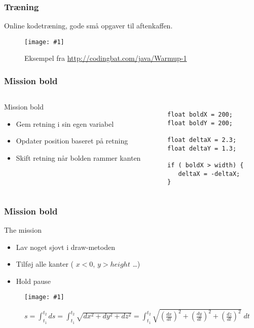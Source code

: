 \documentclass{beamer}
\newcommand{\FIG}[2]{
  \begin{figure}[]
    \centering
    \texttt{[image: \#1]}
    \caption{#2}
    \label{fig:#1}
  \end{figure}
}
\newcommand{\FIGMED}[2]{
  \begin{figure}[]
    \centering
    \texttt{[image: \#1]}
    \caption{#2}
    \label{fig:#1}
  \end{figure}
}
\begin{document}
\begin{frame}
  \frametitle{Træning}
  Online kodetræning, gode små opgaver til aftenkaffen.
  \FIG{codingbat}{Eksempel fra \url{http://codingbat.com/java/Warmup-1}}
\end{frame}


\begin{frame}[fragile]
  \frametitle{Mission bold}
  \begin{columns}
    \begin{column}{0.45\textwidth}
      \begin{block}{Mission bold}
        \begin{itemize}
        \item Gem retning i sin egen variabel
        \item Opdater position baseret på retning
        \item Skift retning når bolden rammer kanten
        \end{itemize}
      \end{block}
    \end{column}
    \begin{column}{0.55\textwidth}
\begin{verbatim} 

float boldX = 200;
float boldY = 200;

float deltaX = 2.3;
float deltaY = 1.3;

if ( boldX > width) {
   deltaX = -deltaX;
}

\end{verbatim}
    \end{column}
  \end{columns}
\end{frame}


\begin{frame}
  \frametitle{Mission bold }

  \begin{block}{The mission}
    \begin{itemize}
    \item Lav noget sjovt i draw-metoden
    \item Tilføj alle kanter ( $x < 0$, $ y > height$ \ldots)
    \item Hold pause
    \end{itemize}
  \end{block}
\end{frame}


\begin{frame}[plain]

  \FIGMED{curve}{$s =  \int_{t_1}^{t_2} ds =\int_{t_1}^{t_2} \sqrt{dx^2 + dy^2 + dz^2} = \int_{t_1}^{t_2} \sqrt{\left(\frac{dx}{dt}\right)^2 + \left(\frac{dy}{dt}\right)^2 + \left(\frac{dz}{dt}\right)^2}\; dt$}
  
\end{frame}
\end{document}
